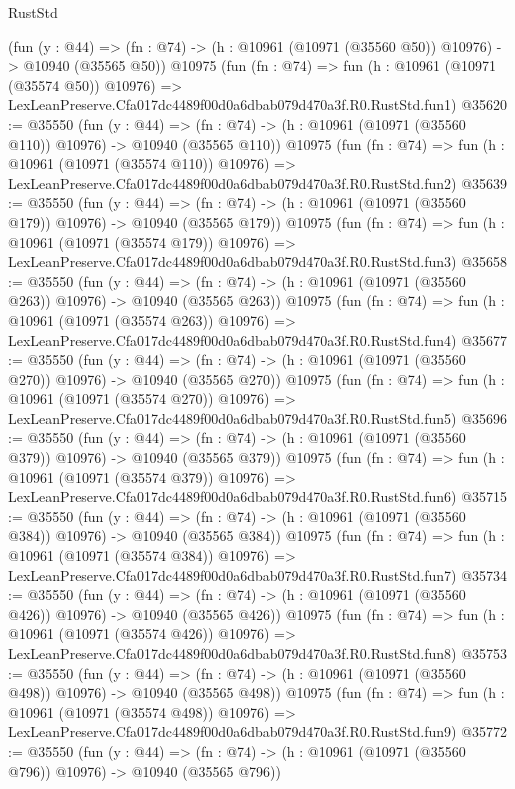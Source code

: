 \begin{lexlean}{RustStd}
\begin{coremodule}
    (fun (y : @44) =>
    (fn : @74) -> (h : @10961 (@10971 (@35560 @50)) @10976) -> @10940 (@35565 @50))
    @10975
    (fun (fn : @74) =>
    fun (h : @10961 (@10971 (@35574 @50)) @10976) =>
    LexLeanPreserve.Cfa017dc4489f00d0a6dbab079d470a3f.R0.RustStd.fun1)
@35620 := @35550
    (fun (y : @44) =>
    (fn : @74) -> (h : @10961 (@10971 (@35560 @110)) @10976) -> @10940 (@35565 @110))
    @10975
    (fun (fn : @74) =>
    fun (h : @10961 (@10971 (@35574 @110)) @10976) =>
    LexLeanPreserve.Cfa017dc4489f00d0a6dbab079d470a3f.R0.RustStd.fun2)
@35639 := @35550
    (fun (y : @44) =>
    (fn : @74) -> (h : @10961 (@10971 (@35560 @179)) @10976) -> @10940 (@35565 @179))
    @10975
    (fun (fn : @74) =>
    fun (h : @10961 (@10971 (@35574 @179)) @10976) =>
    LexLeanPreserve.Cfa017dc4489f00d0a6dbab079d470a3f.R0.RustStd.fun3)
@35658 := @35550
    (fun (y : @44) =>
    (fn : @74) -> (h : @10961 (@10971 (@35560 @263)) @10976) -> @10940 (@35565 @263))
    @10975
    (fun (fn : @74) =>
    fun (h : @10961 (@10971 (@35574 @263)) @10976) =>
    LexLeanPreserve.Cfa017dc4489f00d0a6dbab079d470a3f.R0.RustStd.fun4)
@35677 := @35550
    (fun (y : @44) =>
    (fn : @74) -> (h : @10961 (@10971 (@35560 @270)) @10976) -> @10940 (@35565 @270))
    @10975
    (fun (fn : @74) =>
    fun (h : @10961 (@10971 (@35574 @270)) @10976) =>
    LexLeanPreserve.Cfa017dc4489f00d0a6dbab079d470a3f.R0.RustStd.fun5)
@35696 := @35550
    (fun (y : @44) =>
    (fn : @74) -> (h : @10961 (@10971 (@35560 @379)) @10976) -> @10940 (@35565 @379))
    @10975
    (fun (fn : @74) =>
    fun (h : @10961 (@10971 (@35574 @379)) @10976) =>
    LexLeanPreserve.Cfa017dc4489f00d0a6dbab079d470a3f.R0.RustStd.fun6)
@35715 := @35550
    (fun (y : @44) =>
    (fn : @74) -> (h : @10961 (@10971 (@35560 @384)) @10976) -> @10940 (@35565 @384))
    @10975
    (fun (fn : @74) =>
    fun (h : @10961 (@10971 (@35574 @384)) @10976) =>
    LexLeanPreserve.Cfa017dc4489f00d0a6dbab079d470a3f.R0.RustStd.fun7)
@35734 := @35550
    (fun (y : @44) =>
    (fn : @74) -> (h : @10961 (@10971 (@35560 @426)) @10976) -> @10940 (@35565 @426))
    @10975
    (fun (fn : @74) =>
    fun (h : @10961 (@10971 (@35574 @426)) @10976) =>
    LexLeanPreserve.Cfa017dc4489f00d0a6dbab079d470a3f.R0.RustStd.fun8)
@35753 := @35550
    (fun (y : @44) =>
    (fn : @74) -> (h : @10961 (@10971 (@35560 @498)) @10976) -> @10940 (@35565 @498))
    @10975
    (fun (fn : @74) =>
    fun (h : @10961 (@10971 (@35574 @498)) @10976) =>
    LexLeanPreserve.Cfa017dc4489f00d0a6dbab079d470a3f.R0.RustStd.fun9)
@35772 := @35550
    (fun (y : @44) =>
    (fn : @74) -> (h : @10961 (@10971 (@35560 @796)) @10976) -> @10940 (@35565 @796))

\end{coremodule}
\end{lexlean}
